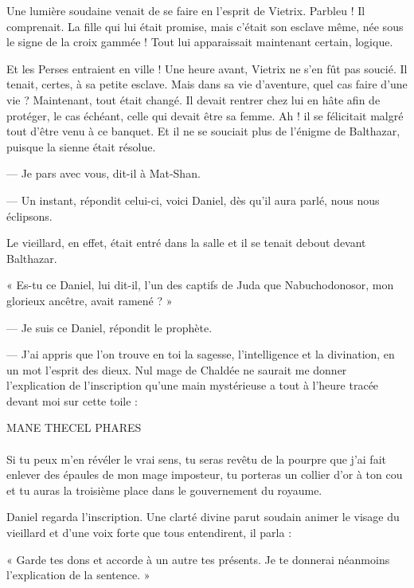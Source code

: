 \documentclass[a4paper, 11pt, oneside, polutonikogreek, french]{article}
\begin{document}
Une lumière soudaine venait de se faire en l'esprit de Vietrix. Parbleu ! Il comprenait. La fille qui lui était promise, mais c'était son esclave même, née sous le signe de la croix gammée ! Tout lui apparaissait maintenant certain, logique.

Et les Perses entraient en ville ! Une heure avant, Vietrix ne s'en fût pas soucié. Il tenait, certes, à sa petite esclave. Mais dans sa vie d'aventure, quel cas faire d'une vie ? Maintenant, tout était changé. Il devait rentrer chez lui en hâte afin de protéger, le cas échéant, celle qui devait être sa femme. Ah ! il se félicitait malgré tout d'être venu à ce banquet. Et il ne se souciait plus de l'énigme de Balthazar, puisque la sienne était résolue.

--- Je pars avec vous, dit-il à Mat-Shan.

--- Un instant, répondit celui-ci, voici Daniel, dès qu'il aura parlé, nous nous éclipsons.

\bigskip
\centerline{\EightStarTaper}
\centerline{\EightStarTaper\EightStarTaper}
\bigskip

Le vieillard, en effet, était entré dans la salle et il se tenait debout devant Balthazar.

« Es-tu ce Daniel, lui dit-il, l'un des captifs de Juda que Nabuchodonosor, mon glorieux ancêtre, avait ramené ? »

--- Je suis ce Daniel, répondit le prophète.

--- J'ai appris que l'on trouve en toi la sagesse, l'intelligence et la divination, en un mot l'esprit des dieux. Nul mage de Chaldée ne saurait me donner l'explication de l'inscription qu'une main mystérieuse a tout à l'heure tracée devant moi sur cette toile :

\begin{center}
MANE THECEL PHARES
\end{center}
\paragraph{}
Si tu peux m'en révéler le vrai sens, tu seras revêtu de la pourpre que j'ai fait enlever des épaules de mon mage imposteur, tu porteras un collier d'or à ton cou et tu auras la troisième place dans le gouvernement du royaume.

Daniel regarda l'inscription. Une clarté divine parut soudain animer le visage du vieillard et d'une voix forte que tous entendirent, il parla :

« Garde tes dons et accorde à un autre tes présents. Je te donnerai néanmoins l'explication de la sentence. »
\end{document}
